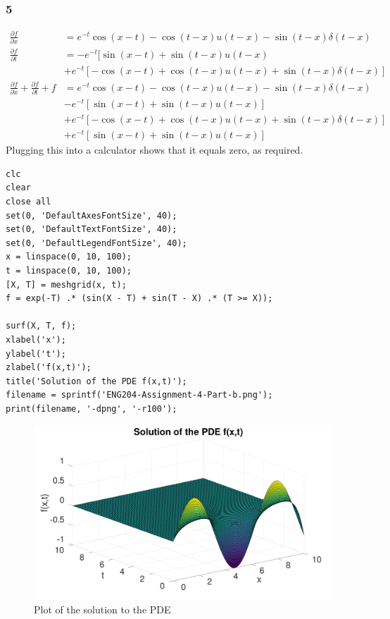 \documentclass[11pt]{article}
\begin{document}
\subsubsection{5}
\label{sec:orge6fc743}
\begin{align*}
\frac{\partial f}{\partial x}&=e^{-t}\cos(x-t)-\cos(t-x)u(t-x)-\sin(t-x)\delta(t-x)\\
\frac{\partial f}{\partial t}&=-e^{-t}[\sin(x-t)+\sin(t-x)u(t-x) \\
&+e^{-t}[-\cos(x-t)+\cos(t-x)u(t-x)+\sin(t-x)\delta(t-x)] \\
\frac{\partial f}{\partial x}+\frac{\partial f}{\partial t}+f &=e^{-t}\cos(x-t)-\cos(t-x)u(t-x)-\sin(t-x)\delta(t-x)\\
&-e^{-t}[\sin(x-t)+\sin(t-x)u(t-x)]\\
&+e^{-t}[-\cos(x-t)+\cos(t-x)u(t-x)+\sin(t-x)\delta(t-x)]\\
&+e^{-t}[\sin(x-t)+\sin(t-x)u(t-x)]
\end{align*}
Plugging this into a calculator shows that it equals zero, as required.
\begin{verbatim}
clc
clear
close all
set(0, 'DefaultAxesFontSize', 40);
set(0, 'DefaultTextFontSize', 40);
set(0, 'DefaultLegendFontSize', 40);
x = linspace(0, 10, 100);
t = linspace(0, 10, 100);
[X, T] = meshgrid(x, t);
f = exp(-T) .* (sin(X - T) + sin(T - X) .* (T >= X));

surf(X, T, f);
xlabel('x');
ylabel('t');
zlabel('f(x,t)');
title('Solution of the PDE f(x,t)');
filename = sprintf('ENG204-Assignment-4-Part-b.png');
print(filename, '-dpng', '-r100');
\end{verbatim}
\begin{FIGURE}
\begin{figure}[H]
\centering
\includegraphics[width=.9\linewidth]{ENG204-Assignment-4-Part-b.png}
\caption{Plot of the solution to the PDE}
\end{figure}
\end{FIGURE}
\end{document}

